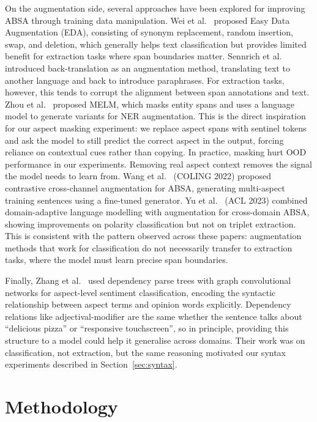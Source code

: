 \documentclass[12pt,a4paper]{report}
\begin{document}
On the augmentation side, several approaches have been explored for improving ABSA through training data manipulation. Wei et al.~\cite{wei2019eda} proposed Easy Data Augmentation (EDA), consisting of synonym replacement, random insertion, swap, and deletion, which generally helps text classification but provides limited benefit for extraction tasks where span boundaries matter. Sennrich et al.~\cite{sennrich2016backtranslation} introduced back-translation as an augmentation method, translating text to another language and back to introduce paraphrases. For extraction tasks, however, this tends to corrupt the alignment between span annotations and text. Zhou et al.~\cite{zhou2022melm} proposed MELM, which masks entity spans and uses a language model to generate variants for NER augmentation. This is the direct inspiration for our aspect masking experiment: we replace aspect spans with sentinel tokens and ask the model to still predict the correct aspect in the output, forcing reliance on contextual cues rather than copying. In practice, masking hurt OOD performance in our experiments. Removing real aspect context removes the signal the model needs to learn from. Wang et al.~\cite{wang2022contrastive_aug} (COLING 2022) proposed contrastive cross-channel augmentation for ABSA, generating multi-aspect training sentences using a fine-tuned generator. Yu et al.~\cite{yu2023crossdomain_aug} (ACL 2023) combined domain-adaptive language modelling with augmentation for cross-domain ABSA, showing improvements on polarity classification but not on triplet extraction. This is consistent with the pattern observed across these papers: augmentation methods that work for classification do not necessarily transfer to extraction tasks, where the model must learn precise span boundaries.

Finally, Zhang et al.~\cite{zhang2019aspect} used dependency parse trees with graph convolutional networks for aspect-level sentiment classification, encoding the syntactic relationship between aspect terms and opinion words explicitly. Dependency relations like adjectival-modifier are the same whether the sentence talks about ``delicious pizza'' or ``responsive touchscreen'', so in principle, providing this structure to a model could help it generalise across domains. Their work was on classification, not extraction, but the same reasoning motivated our syntax experiments described in Section~\ref{sec:syntax}.



\chapter{Methodology}\label{ch:methodology}
\end{document}
